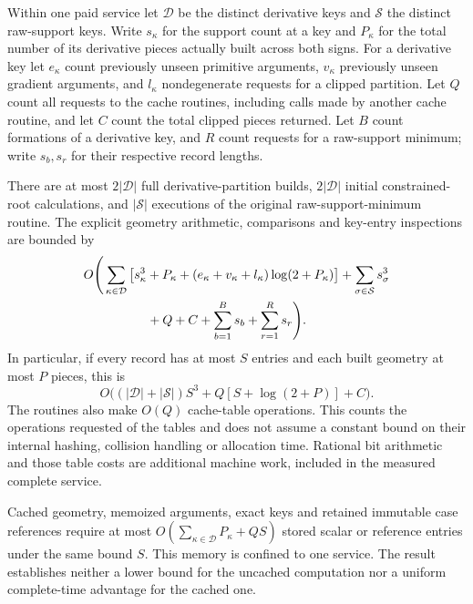\begin{proposition}
\label{prop:cachework126c}
Within one paid service let $\mathcal D$ be the distinct derivative keys and
$\mathcal S$ the distinct raw-support keys.  Write $s_\kappa$ for the
support count at a key and $P_\kappa$ for the total number of its derivative
pieces actually built across both signs.  For a derivative key let
$e_\kappa$ count previously unseen primitive arguments,
$v_\kappa$ previously unseen gradient arguments, and $l_\kappa$
nondegenerate requests for a clipped partition.  Let $Q$ count all requests
to the cache routines, including calls made by another cache routine, and
let $C$ count the total clipped pieces returned.  Let $B$ count formations
of a derivative key, and $R$ count requests for a raw-support minimum;
write $s_b,s_r$ for their respective record lengths.

There are at most $2|\mathcal D|$ full derivative-partition builds,
$2|\mathcal D|$ initial constrained-root calculations, and
$|\mathcal S|$ executions of the original raw-support-minimum routine.
The explicit geometry arithmetic, comparisons and key-entry inspections
are bounded by
\begin{align}
 O\Bigg(&\sum_{\kappa\in\mathcal D}
   \left[s_\kappa^3+P_\kappa+
    (e_\kappa+v_\kappa+l_\kappa)\log(2+P_\kappa)\right]
   +\sum_{\sigma\in\mathcal S}s_\sigma^3 \nonumber\\
 &\hspace{12mm}+Q+C+\sum_{b=1}^{B}s_b+\sum_{r=1}^{R}s_r\Bigg).
 \label{eq:cachework126c}
\end{align}
In particular, if every record has at most $S$ entries and each built
geometry at most $P$ pieces, this is
\[
 O\big((|\mathcal D|+|\mathcal S|)S^3
                   +Q[S+\log(2+P)]+C\big).
\]
The routines also make $O(Q)$ cache-table operations.  This counts the
operations requested of the tables and does not assume a constant bound
on their internal hashing, collision handling or allocation time.  Rational
bit arithmetic and those table costs are additional machine work, included
in the measured complete service.

Cached geometry, memoized arguments, exact keys and retained immutable
case references require at most
$O(\sum_{\kappa\in\mathcal D}P_\kappa+QS)$ stored scalar or reference
entries under the same bound $S$.  This memory is confined to one service.
The result establishes neither a lower bound for the uncached computation
nor a uniform complete-time advantage for the cached one.
\end{proposition}

